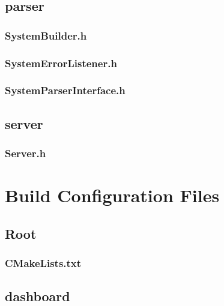 \subsection*{parser}

\subsubsection*{SystemBuilder.h}


\subsubsection*{SystemErrorListener.h}


\subsubsection*{SystemParserInterface.h}


\subsection*{server}

\subsubsection*{Server.h}


\section{Build Configuration Files}

\subsection*{Root}

\subsubsection*{CMakeLists.txt}


\subsection*{dashboard}

